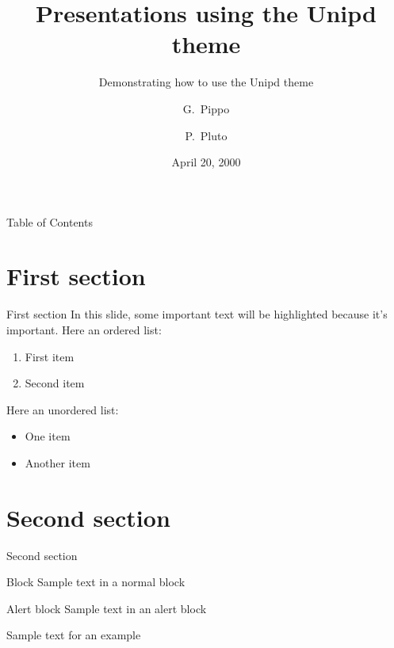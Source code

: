 \documentclass{beamer}
\title{Presentations using the Unipd theme}
\subtitle{Demonstrating how to use the Unipd theme}
\author[Pippo, Pluto]{G.~Pippo \and P.~Pluto}
\date{April 20, 2000}
\begin{document}
\frame{\titlepage}

\begin{frame}{Table of Contents}
    \tableofcontents    
\end{frame}

\section{First section}

    \begin{frame}{First section}
        In this slide, some important text will be
        \alert{highlighted} because it's important.
        Here an ordered list:
        \begin{enumerate}
            \item First item
            \item Second item
        \end{enumerate}
        Here an unordered list: 
        \begin{itemize}
            \item One item
            \item Another item
        \end{itemize}
    \end{frame}
    
\section{Second section}

    \begin{frame}{Second section}
        \begin{block}{Block}
            Sample text in a normal block
        \end{block}
   
        \begin{alertblock}{Alert block}
            Sample text in an alert block
        \end{alertblock}    
        
         \begin{example}
            Sample text for an example
        \end{example}
    \end{frame}
    
\end{document}
